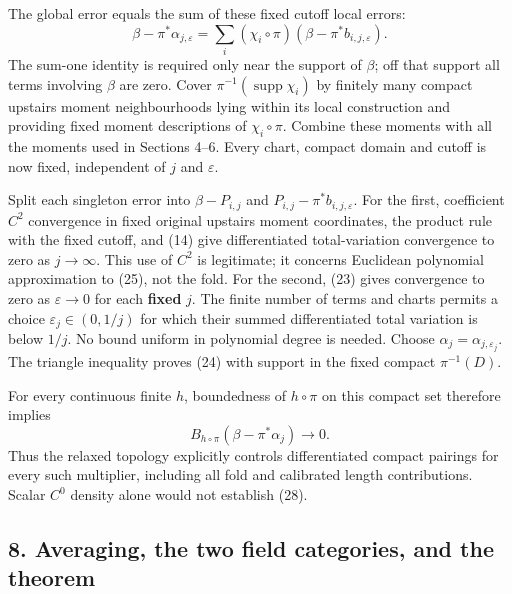 \documentclass[
  11pt,
]{article}
\begin{document}
The global error equals the sum of these fixed cutoff local errors: \[
 \beta-\pi^*\alpha_{j,\varepsilon}
     =\sum_i(\chi_i\circ\pi)
                  (\beta-\pi^*b_{i,j,\varepsilon}).         \tag{27}
\] The sum-one identity is required only near the support of \(\beta\);
off that support all terms involving \(\beta\) are zero. Cover
\(\pi^{-1}(\operatorname{supp}\chi_i)\) by finitely many compact
upstairs moment neighbourhoods lying within its local construction and
providing fixed moment descriptions of \(\chi_i\circ\pi\). Combine these
moments with all the moments used in Sections 4--6. Every chart, compact
domain and cutoff is now fixed, independent of \(j\) and
\(\varepsilon\).

Split each singleton error into \(\beta-P_{i,j}\) and
\(P_{i,j}-\pi^*b_{i,j,\varepsilon}\). For the first, coefficient \(C^2\)
convergence in fixed original upstairs moment coordinates, the product
rule with the fixed cutoff, and (14) give differentiated total-variation
convergence to zero as \(j\to\infty\). This use of \(C^2\) is
legitimate; it concerns Euclidean polynomial approximation to (25), not
the fold. For the second, (23) gives convergence to zero as
\(\varepsilon\to0\) for each \textbf{fixed} \(j\). The finite number of
terms and charts permits a choice \(\varepsilon_j\in(0,1/j)\) for which
their summed differentiated total variation is below \(1/j\). No bound
uniform in polynomial degree is needed. Choose
\(\alpha_j=\alpha_{j,\varepsilon_j}\). The triangle inequality proves
(24) with support in the fixed compact \(\pi^{-1}(D)\).

For every continuous finite \(h\), boundedness of \(h\circ\pi\) on this
compact set therefore implies \[
 B_{h\circ\pi}(\beta-\pi^*\alpha_j)\longrightarrow0.        \tag{28}
\] Thus the relaxed topology explicitly controls differentiated compact
pairings for every such multiplier, including all fold and calibrated
length contributions. Scalar \(C^0\) density alone would not establish
(28).

\subsection{8. Averaging, the two field categories, and the
theorem}\label{averaging-the-two-field-categories-and-the-theorem}
\end{document}
